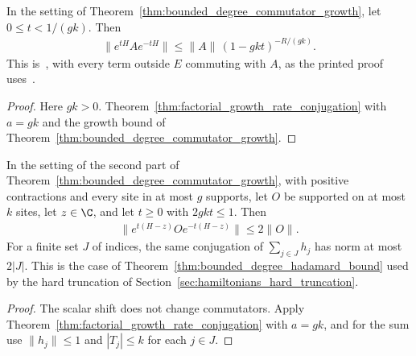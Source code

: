 \begin{theorem}
    \label{thm:bounded_degree_hadamard_bound}
    \leanok
    In the setting of Theorem~\ref{thm:bounded_degree_commutator_growth}, let
    $0\le t<1/(gk)$. Then
    \begin{align}
        \bigl\lVert e^{tH}Ae^{-tH}\bigr\rVert\le\lVert A\rVert\,(1-gkt)^{-R/(gk)}.
    \end{align}
    This is~\cite[Lemma~3.1, lines 795--880]{Arad2014Connecting},
    with every term outside $E$ commuting with $A$, as the printed proof
    uses~\cite{gap:akl14_hadamard_bound_scope}.
\end{theorem}
\begin{proof}\leanok
    Here $gk>0$. Theorem~\ref{thm:factorial_growth_rate_conjugation} with $a=gk$ and the
    growth bound of Theorem~\ref{thm:bounded_degree_commutator_growth}.
\end{proof}

\begin{theorem}
    \label{thm:bounded_degree_imaginary_time}
    \leanok
    In the setting of the second part of
    Theorem~\ref{thm:bounded_degree_commutator_growth}, with positive contractions and
    every site in at most $g$ supports, let $O$ be supported on at most $k$ sites, let
    $z\in\C$, and let $t\ge0$ with $2gkt\le1$. Then
    \begin{align}
        \bigl\lVert e^{t(H-z)}Oe^{-t(H-z)}\bigr\rVert\le2\lVert O\rVert.
    \end{align}
    For a finite set $J$ of indices, the same conjugation of $\sum_{j\in J}h_j$
    has norm at most $2|J|$. This is the case of Theorem~\ref{thm:bounded_degree_hadamard_bound}
    used by the hard truncation of Section~\ref{sec:hamiltonians_hard_truncation}.
\end{theorem}
\begin{proof}\leanok
    The scalar shift does not change commutators. Apply
    Theorem~\ref{thm:factorial_growth_rate_conjugation} with $a=gk$, and for the
    sum use $\lVert h_j\rVert\le1$ and $|T_j|\le k$ for each $j\in J$.
\end{proof}
